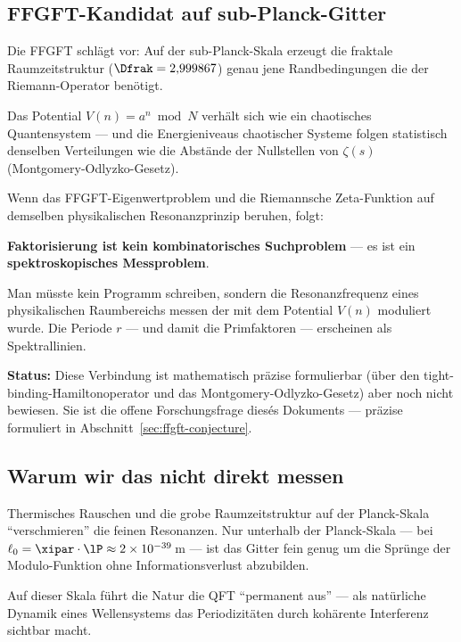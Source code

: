 \subsection{FFGFT-Kandidat auf sub-Planck-Gitter}

Die FFGFT schlägt vor:
Auf der sub-Planck-Skala erzeugt die fraktale
Raumzeitstruktur ($\Dfrak = 2{,}999867$)
genau jene Randbedingungen die der
Riemann-Operator benötigt.

Das Potential $V(n) = a^n \bmod N$ verhält sich
wie ein chaotisches Quantensystem ---
und die Energieniveaus chaotischer Systeme
folgen statistisch denselben Verteilungen
wie die Abstände der Nullstellen von $\zeta(s)$
(Montgomery-Odlyzko-Gesetz).

\begin{keyresult}
Wenn das FFGFT-Eigenwertproblem und die
Riemannsche Zeta-Funktion auf demselben
physikalischen Resonanzprinzip beruhen, folgt:

\textbf{Faktorisierung ist kein kombinatorisches
Suchproblem} --- es ist ein
\textbf{spektroskopisches Messproblem}.

Man müsste kein Programm schreiben,
sondern die Resonanzfrequenz eines physikalischen
Raumbereichs messen der mit dem Potential $V(n)$
moduliert wurde.
Die Periode $r$ --- und damit die Primfaktoren ---
erscheinen als Spektrallinien.

\medskip
\textbf{Status:} Diese Verbindung ist
mathematisch präzise formulierbar
(über den tight-binding-Hamiltonoperator
und das Montgomery-Odlyzko-Gesetz)
aber noch nicht bewiesen.
Sie ist die offene Forschungsfrage
diesés Dokuments --- präzise formuliert in
Abschnitt~\ref{sec:ffgft-conjecture}.
\end{keyresult}

\subsection{Warum wir das nicht direkt messen}

Thermisches Rauschen und die grobe Raumzeitstruktur
auf der Planck-Skala ``verschmieren'' die
feinen Resonanzen.
Nur unterhalb der Planck-Skala ---
bei $\ell_0 = \xipar \cdot \lP \approx 2 \times 10^{-39}$\,m ---
ist das Gitter fein genug um die Sprünge
der Modulo-Funktion ohne Informationsverlust abzubilden.

Auf dieser Skala führt die Natur die QFT
``permanent aus'' --- als natürliche Dynamik
eines Wellensystems das Periodizitäten
durch kohärente Interferenz sichtbar macht.

